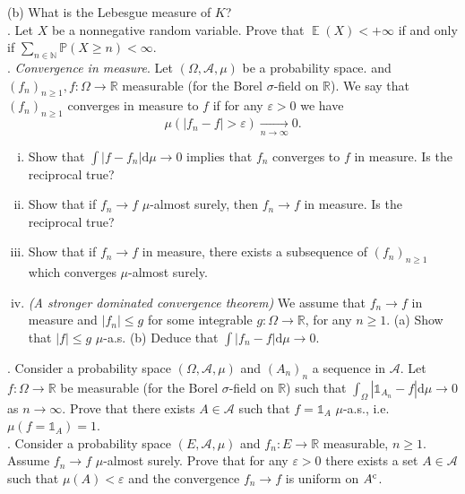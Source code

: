 \documentclass[11pt,reqno]{amsart}
\DeclareMathOperator{\E}{\mathbb{E}}      %
\theoremstyle{definition}
\theoremstyle{remark}
\newcommand{\rd}{{\mathrm{d}}}            %
\newcommand{\1}{\mathds{1}}
\numberwithin{equation}{section}
\begin{document}
(b) What is the Lebesgue measure of $K$?\\


.
Let $X$ be a nonnegative random variable. Prove that $\E(X)<+\infty$ if and only if $\sum_{n\in\mathbb{N}}\mathbb{P}(X\geq n)<\infty$.\\


. {\it Convergence in measure}.
Let $(\Omega,\mathcal{A},\mu)$ be a probability space.  and $(f_n)_{n\geq 1}, f:\Omega\to\mathbb{R}$ measurable (for the Borel $\sigma$-field on $\mathbb{R}$). We say that $(f_n)_{n\geq 1}$ converges in measure to $f$ if for any $\varepsilon>0$ we have
$$
\mathbb{\mu}(|f_n-f|>\varepsilon)\underset{n\to\infty}{\longrightarrow}0.
$$
\begin{enumerate}[(i)]
\item Show that $\int|f-f_n|\rd\mu\to 0$ implies that $f_n$ converges to $f$ in measure.  Is the reciprocal true?
\item Show that if $f_n\to f$ $\mu$-almost surely, then $f_n\to f$ in measure. Is the reciprocal true?
\item Show that if $f_n\to f$ in measure, there exists a subsequence of $(f_n)_{n\geq 1}$ which converges  $\mu$-almost surely.
\item {\it (A stronger dominated convergence theorem)} We assume that $f_n\to f$ in measure and $|f_n|\leq g$ for some integrable $g:\Omega\to \mathbb{R}$, for any $n\geq 1$.
\subitem (a) Show that $|f|\leq g$ $\mu$-a.s.
\subitem (b) Deduce that $\int |f_n-f|\rd\mu\to 0$.
\end{enumerate}


.  Consider a probability space $(\Omega,\mathcal{A},\mu)$ and $(A_n)_{n}$ a sequence in $\mathcal{A}$.  Let $f:\Omega\to\mathbb{R}$ be measurable (for the Borel $\sigma$-field on $\mathbb{R}$) such that $\int_{\Omega}|\1_{A_n}-f|\rd \mu\to 0$ as $n\to\infty$. Prove that there exists $A\in\mathcal{A}$ such that $f=\1_A$ $\mu$-a.s., i.e.  $\mu(f=\1_A)=1$.\\


.  Consider a probability space $(E,\mathcal{A},\mu)$ and $f_n:E\to\mathbb{R}$ measurable, $n\geq 1$. Assume $f_n\to f$ $\mu$-almost surely.  Prove that for any $\varepsilon>0$
 there exists a set $A\in\mathcal{A}$ such that $\mu(A)<\varepsilon$ and the convergence $f_n\to f$ is uniform on $A^{\rm c}$.
\end{document}
